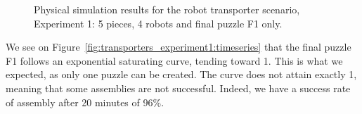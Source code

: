 \begin{figure}[h!]
	\centering
	\caption{Physical simulation results for the robot transporter scenario, Experiment 1: 5 pieces, 4 robots and final puzzle F1 only.}
\label{fig:transporters_experiment1} %
\end{figure}

We see on Figure~\ref{fig:transporters_experiment1:timeseries} that the final puzzle F1 follows an exponential saturating curve, tending toward 1. This is what we expected, as only one puzzle can be created. The curve does not attain exactly 1, meaning that some assemblies are not successful. Indeed, we have a success rate of assembly after 20 minutes of 96\%.

